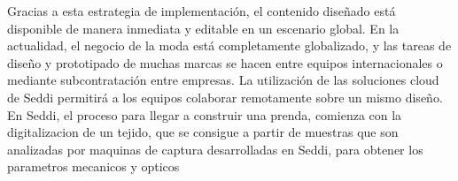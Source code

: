 Gracias a esta estrategia de implementación, el contenido diseñado está disponible de manera inmediata y editable en un escenario global. En la
actualidad, el negocio de la moda está completamente globalizado, y las tareas de diseño y prototipado de muchas marcas se hacen entre equipos
internacionales o mediante subcontratación entre empresas. La  utilización de las soluciones cloud de Seddi permitirá a los equipos colaborar remotamente sobre un mismo diseño.
En Seddi, el proceso para llegar a construir una prenda, comienza con la digitalizacion de un tejido, que se consigue a partir de muestras que
son analizadas por maquinas de captura desarrolladas en Seddi, para obtener los parametros mecanicos y opticos
